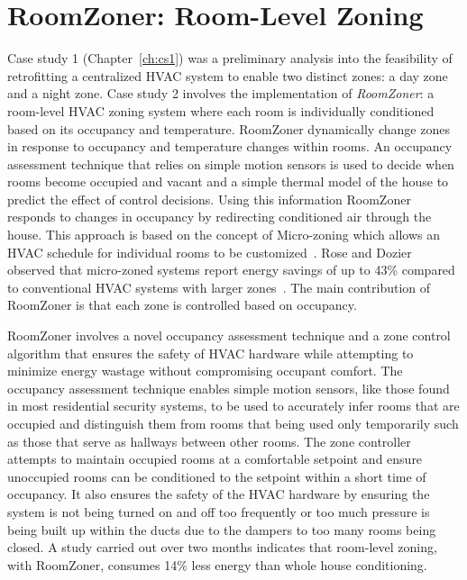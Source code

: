 \chapter{RoomZoner: Room-Level Zoning}
\label{ch:cs2}


Case study 1 (Chapter~\ref{ch:cs1}) was a preliminary analysis into the
feasibility of retrofitting a centralized HVAC system to enable two distinct
zones: a day zone and a night zone. Case study 2 involves the implementation of
{\em RoomZoner}: a room-level HVAC zoning system where each room is individually
conditioned based on its occupancy and temperature. RoomZoner dynamically change
zones in response to occupancy and temperature changes within rooms. An
occupancy assessment technique that relies on simple motion sensors is used to
decide when rooms become occupied and vacant and a simple thermal model of the
house to predict the effect of control decisions. Using this information
RoomZoner responds to changes in occupancy by redirecting conditioned
air through the house. This approach is based on the concept of Micro-zoning
which allows an HVAC schedule for individual rooms to be
customized~\cite{Airgonomix2008}. Rose and Dozier observed that micro-zoned
systems report energy savings of up to 43\% compared to conventional HVAC
systems with larger zones~\cite{rose1997epa}. The main contribution of RoomZoner
is that each zone is controlled based on occupancy.

RoomZoner involves a novel occupancy assessment technique and a zone control
algorithm that ensures the safety of HVAC hardware while attempting to minimize
energy wastage without compromising occupant comfort. The occupancy assessment
technique enables simple motion sensors, like those found in most residential
security systems, to be used to accurately infer rooms that are occupied and
distinguish them from rooms that being used only temporarily such as those that
serve as hallways between other rooms. The zone controller attempts to maintain
occupied rooms at a comfortable setpoint and ensure unoccupied rooms can be
conditioned to the setpoint within a short time of occupancy. It also ensures
the safety of the HVAC hardware by ensuring the system is not being turned on
and off too frequently or too much pressure is being built up within the
ducts due to the dampers to too many rooms being closed. A study carried out
over two months indicates that room-level zoning, with RoomZoner, consumes 14\%
less energy than whole house conditioning. 

